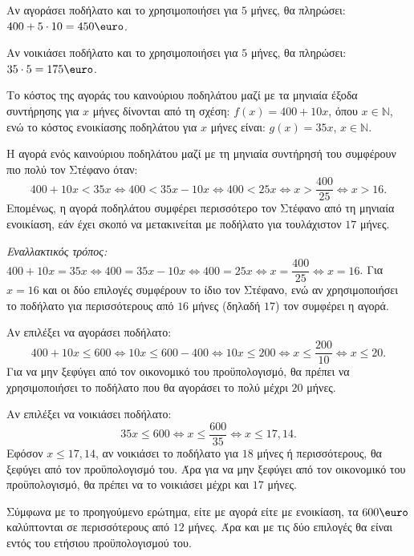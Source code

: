 
\begin{alist}
\item
\begin{rlist}
\item Αν αγοράσει ποδήλατο και το χρησιμοποιήσει για $5$ μήνες, θα πληρώσει:
$400 + 5 \cdot 10 = 450\text{\euro}$.
\item Αν νοικιάσει ποδήλατο και το χρησιμοποιήσει για $5$ μήνες, θα πληρώσει:
$35 \cdot 5 = 175\text{\euro}$.
\end{rlist}

\item Το κόστος της αγοράς του καινούριου ποδηλάτου μαζί με τα μηνιαία έξοδα συντήρησης για $x$ μήνες δίνονται από τη σχέση: $f(x) = 400 + 10x$, όπου $x \in \mathbb{N}$, ενώ το κόστος ενοικίασης ποδηλάτου για $x$ μήνες είναι: $g(x) = 35x$, $x \in \mathbb{N}$.

\item Η αγορά ενός καινούριου ποδηλάτου μαζί με τη μηνιαία συντήρησή του συμφέρουν πιο πολύ τον Στέφανο όταν:
\[400 + 10x < 35x \Leftrightarrow 400 < 35x - 10x \Leftrightarrow 400 < 25x \Leftrightarrow x > \dfrac{400}{25} \Leftrightarrow x > 16.\]
Επομένως, η αγορά ποδηλάτου συμφέρει περισσότερο τον Στέφανο από τη μηνιαία ενοικίαση, εάν έχει σκοπό να μετακινείται με ποδήλατο για τουλάχιστον $17$ μήνες.

\textit{Εναλλακτικός τρόπος:}
$400 + 10x = 35x \Leftrightarrow 400 = 35x - 10x \Leftrightarrow 400 = 25x \Leftrightarrow x = \dfrac{400}{25} \Leftrightarrow x = 16$. Για $x = 16$ και οι δύο επιλογές συμφέρουν το ίδιο τον Στέφανο, ενώ αν χρησιμοποιήσει το ποδήλατο για περισσότερους από $16$ μήνες (δηλαδή $17$) τον συμφέρει η αγορά.

\item
\begin{rlist}
\item Αν επιλέξει να αγοράσει ποδήλατο:
\[400 + 10x \le 600 \Leftrightarrow 10x \le 600 - 400 \Leftrightarrow 10x \le 200 \Leftrightarrow x \le \dfrac{200}{10} \Leftrightarrow x \le 20.\]
Για να μην ξεφύγει από τον οικονομικό του προϋπολογισμό, θα πρέπει να χρησιμοποιήσει το ποδήλατο που θα αγοράσει το πολύ μέχρι $20$ μήνες.

Αν επιλέξει να νοικιάσει ποδήλατο:
\[35x \le 600 \Leftrightarrow x \le \dfrac{600}{35} \Leftrightarrow x \le 17,14.\]
Εφόσον $x \le 17,14$, αν νοικιάσει το ποδήλατο για $18$ μήνες ή περισσότερους, θα ξεφύγει από τον προϋπολογισμό του. Άρα για να μην ξεφύγει από τον οικονομικό του προϋπολογισμό, θα πρέπει να το νοικιάσει μέχρι και $17$ μήνες.
\item Σύμφωνα με το προηγούμενο ερώτημα, είτε με αγορά είτε με ενοικίαση, τα $600\text{\euro}$ καλύπτονται σε περισσότερους από $12$ μήνες. Άρα και με τις δύο επιλογές θα είναι εντός του ετήσιου προϋπολογισμού του.
\end{rlist}
\end{alist}

